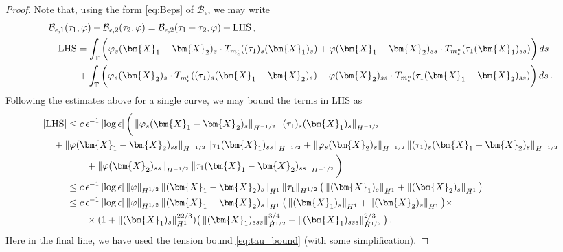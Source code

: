 \documentclass[11pt,reqno]{amsart}
\newcommand{\T}{\mathbb{T}}
\newcommand{\X}{\bm{X}}
\newcommand{\abs}[1]{\left\lvert #1 \right\rvert}
\newcommand{\norm}[1]{\left\lVert #1 \right\rVert}
\newcommand{\mc}[1]{\mathcal{#1}}
\numberwithin{equation}{section}
\theoremstyle{definition}
\begin{document}
\begin{proof}
Note that, using the form \eqref{eq:Beps} of $\mc{B}_\epsilon$, we may write
\begin{equation}
\begin{aligned}
   &\mc{B}_{\epsilon,1}(\tau_1,\varphi) - \mc{B}_{\epsilon,2}(\tau_2,\varphi)
   = \mc{B}_{\epsilon,2}(\tau_1-\tau_2,\varphi) + {\rm LHS}\,,\\
   &\quad {\rm LHS} =\int_\T\bigg( \varphi_s(\X_1-\X_2)_s\cdot T_{m_\epsilon^{\rm t}}((\tau_1)_s(\X_1)_s) + \varphi(\X_1-\X_2)_{ss}\cdot T_{m_\epsilon^{\rm n}}(\tau_1(\X_1)_{ss})\bigg)\,ds\\
  &\qquad\quad +\int_\T\bigg( \varphi_s(\X_2)_s\cdot T_{m_\epsilon^{\rm t}}((\tau_1)_s(\X_1-\X_2)_s) + \varphi(\X_2)_{ss}\cdot T_{m_\epsilon^{\rm n}}(\tau_1(\X_1-\X_2)_{ss})\bigg)\,ds \,.
\end{aligned}
\end{equation}
%
%
Following the estimates above for a single curve, we may bound the terms in LHS as
\begin{equation}
\begin{aligned}
  \abs{{\rm LHS}} &\le c\,\epsilon^{-1}\abs{\log\epsilon}\bigg( \norm{\varphi_s(\X_1-\X_2)_s}_{H^{-1/2}}\norm{(\tau_1)_s(\X_1)_s}_{H^{-1/2}} \\
  &\hspace{-.5cm}+ \norm{\varphi(\X_1-\X_2)_{ss}}_{H^{-1/2}}\norm{\tau_1(\X_1)_{ss}}_{H^{-1/2}}+\norm{\varphi_s(\X_2)_s}_{H^{-1/2}}\norm{(\tau_1)_s(\X_1-\X_2)_s}_{H^{-1/2}}\\
  &\qquad  + \norm{\varphi(\X_2)_{ss}}_{H^{-1/2}}\norm{\tau_1(\X_1-\X_2)_{ss}}_{H^{-1/2}}\bigg)\\
  &\le c\,\epsilon^{-1}\abs{\log\epsilon} \norm{\varphi}_{H^{1/2}}\norm{(\X_1-\X_2)_s}_{H^1}\norm{\tau_1}_{H^{1/2}}\big(\norm{(\X_1)_s}_{H^1}+\norm{(\X_2)_s}_{H^1}\big) \\
  &\le c\,\epsilon^{-1}\abs{\log\epsilon} \norm{\varphi}_{H^{1/2}}\norm{(\X_1-\X_2)_s}_{H^1}\big(\norm{(\X_1)_s}_{H^1}+\norm{(\X_2)_s}_{H^1}\big)\times\\
  &\qquad
  \times (1+\norm{(\X_1)_s}_{H^1}^{22/3})\big(\norm{(\X_1)_{sss}}_{\dot H^{1/2}}^{3/4}+ \norm{(\X_1)_{sss}}_{\dot H^{1/2}}^{2/3}\big)\,.
\end{aligned}
\end{equation}
Here in the final line, we have used the tension bound \eqref{eq:tau_bound} (with some simplification).


\end{proof}
\end{document}
